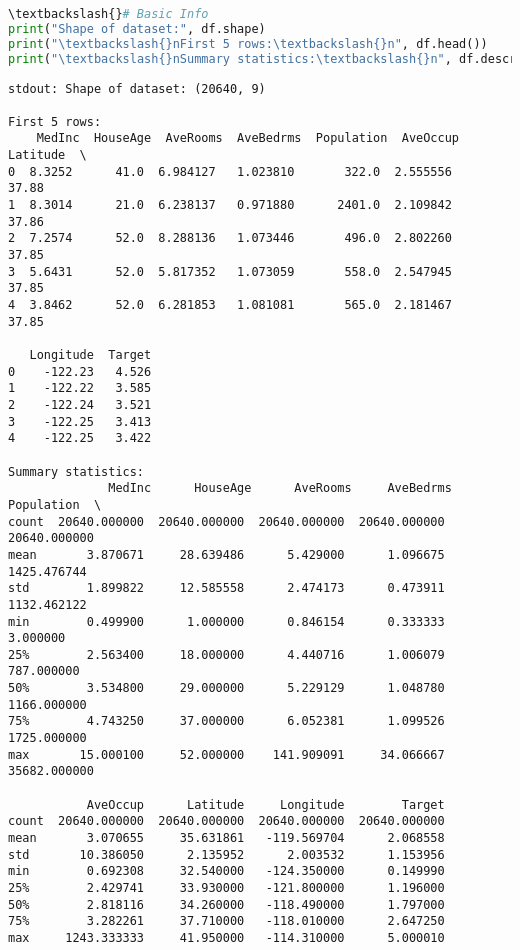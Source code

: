 \documentclass{article}
\begin{document}
\begin{lstlisting}[language=Python]
\textbackslash{}# Basic Info
print("Shape of dataset:", df.shape)
print("\textbackslash{}nFirst 5 rows:\textbackslash{}n", df.head())
print("\textbackslash{}nSummary statistics:\textbackslash{}n", df.describe())
\end{lstlisting}


\begin{verbatim}
stdout: Shape of dataset: (20640, 9)

First 5 rows:
    MedInc  HouseAge  AveRooms  AveBedrms  Population  AveOccup  Latitude  \
0  8.3252      41.0  6.984127   1.023810       322.0  2.555556     37.88   
1  8.3014      21.0  6.238137   0.971880      2401.0  2.109842     37.86   
2  7.2574      52.0  8.288136   1.073446       496.0  2.802260     37.85   
3  5.6431      52.0  5.817352   1.073059       558.0  2.547945     37.85   
4  3.8462      52.0  6.281853   1.081081       565.0  2.181467     37.85   

   Longitude  Target  
0    -122.23   4.526  
1    -122.22   3.585  
2    -122.24   3.521  
3    -122.25   3.413  
4    -122.25   3.422  

Summary statistics:
              MedInc      HouseAge      AveRooms     AveBedrms    Population  \
count  20640.000000  20640.000000  20640.000000  20640.000000  20640.000000   
mean       3.870671     28.639486      5.429000      1.096675   1425.476744   
std        1.899822     12.585558      2.474173      0.473911   1132.462122   
min        0.499900      1.000000      0.846154      0.333333      3.000000   
25%        2.563400     18.000000      4.440716      1.006079    787.000000   
50%        3.534800     29.000000      5.229129      1.048780   1166.000000   
75%        4.743250     37.000000      6.052381      1.099526   1725.000000   
max       15.000100     52.000000    141.909091     34.066667  35682.000000   

           AveOccup      Latitude     Longitude        Target  
count  20640.000000  20640.000000  20640.000000  20640.000000  
mean       3.070655     35.631861   -119.569704      2.068558  
std       10.386050      2.135952      2.003532      1.153956  
min        0.692308     32.540000   -124.350000      0.149990  
25%        2.429741     33.930000   -121.800000      1.196000  
50%        2.818116     34.260000   -118.490000      1.797000  
75%        3.282261     37.710000   -118.010000      2.647250  
max     1243.333333     41.950000   -114.310000      5.000010  

\end{verbatim}
\end{document}
